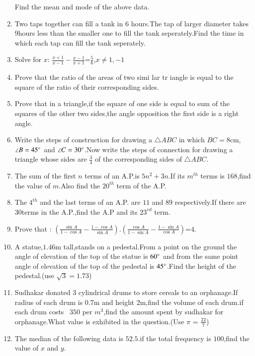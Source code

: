 \documentclass{article}
\begin{document}
\begin{enumerate}
Find the mean and mode of the above data.
\item Two taps together can fill a tank in $6$ hours.The tap of larger diameter takes $9$hours less than the smaller one to fill the tank seperately.Find the time in which each  tap can fill the tank seperately.
\item Solve for $x$: $\frac{x+1}{x-1}-\frac{x-1}{x+1}$=$\frac{5}{6}$,$x \neq 1,-1$
\item Prove that the ratio of the areas of two simi lar tr iangle is equal to the square of the ratio of their corresponding sides.
\item Prove that in a triangle,if the square of one side is equal to sum of the squares of the other  two sides,the angle opposition the first side is a right angle.
\item Write the steps of construction for drawing a $\triangle ABC$ in which $BC=8$cm,$\angle B=45\degree{}$ and $\angle C= 30\degree{}$.Now write the steps of connection for drawing a triangle whose sides are $\frac{3}{4}$ of the corresponding sides of $\triangle ABC$.
\item The sum of the first $n$ terms of an A.P.is $5n^2+3n$.If its $m^{th}$ terms is $168$,find the value of $m$.Also find the $20^{th}$ term of the A.P.
\item The $4^{th}$ and the last terms of an A.P. are $11$ and $89$ respectively.If there are $30$terms in the A.P.,find the A.P and its $23^ {rd}$ term.
\item Prove that : $(\frac{\sin A}{1-\cos A}-\frac{1-\cos A}{\sin A})$.$(\frac{\cos A}{1-\sin A}-\frac{1-\sin A}{\cos A})$=$4$.
\item A statue,$1.46$m tall,stands on a pedestal.From a point on the ground the angle of elevation of the top of the statue is $60\degree{}$ and from the same point angle of elevation of the top of the pedestal is $45\degree{}$.Find the height of the pedestal.(use $\sqrt{3}=1.73$)
\item Sudhakar donated $3$ cylindrical drums to store cereals to an orphanage.If radius of each drum is $0.7$m and height $2$m,find the volume of each drum.if each drum costs \rupee~$350$ per $m^3$,find the amount spent by sudhakar for orphanage.What value is exhibited in the question.(Use $\pi$ = $\frac{22}{7}$)
\item  The median of  the following data is $52.5$.if the total frequency is $100$,find the value of $x$ and $y$. \\
	\begin{tabular}{|c|c|}
\hline

\end{tabular}
\end{enumerate}
\end{document}
